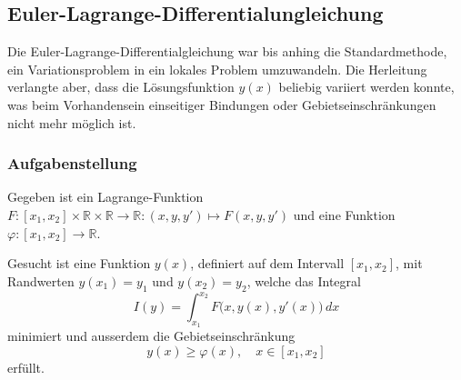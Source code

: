 %
%
\subsection{Euler-Lagrange-Differentialungleichung
\label{buch:nebenbedingungen:einseitig:subsection:eldgl}}
Die Euler-Lagrange-Differentialgleichung war bis anhing die Standardmethode,
ein Variationsproblem in ein lokales Problem umzuwandeln.
Die Herleitung verlangte aber, dass die Lösungsfunktion $y(x)$ beliebig
variiert werden konnte, was beim Vorhandensein einseitiger Bindungen
oder Gebietseinschränkungen nicht mehr möglich ist.

%
%
\subsubsection{Aufgabenstellung}
Gegeben ist ein Lagrange-Funktion
$F\colon [x_1,x_2]\times\mathbb{R}\times\mathbb{R}\to\mathbb{R}:(x,y,y')\mapsto F(x,y,y')$ 
und eine Funktion $\varphi\colon[x_1,x_2]\to\mathbb{R}$.

\begin{aufgabe}
\label{buch:nebenbedingungen:einseitig:aufgabe}
Gesucht ist eine Funktion $y(x)$, definiert auf dem Intervall $[x_1,x_2]$,
mit Randwerten $y(x_1) = y_1$ und $y(x_2)=y_2$, welche das Integral
\[
I(y)
=
\int_{x_1}^{x_2} F\bigl(x,y(x),y'(x)\bigr)\,dx
\]
minimiert und ausserdem die Gebietseinschränkung
\[
y(x) \ge \varphi(x), \quad x\in[x_1,x_2]
\]
erfüllt.
\end{aufgabe}

%
%
